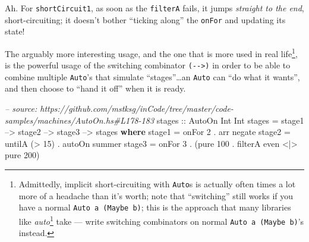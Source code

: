\documentclass[]{article}
\newenvironment{Shaded}{}{}
\newcommand{\KeywordTok}[1]{\textcolor[rgb]{0.00,0.44,0.13}{\textbf{{#1}}}}
\newcommand{\DataTypeTok}[1]{\textcolor[rgb]{0.56,0.13,0.00}{{#1}}}
\newcommand{\DecValTok}[1]{\textcolor[rgb]{0.25,0.63,0.44}{{#1}}}
\newcommand{\CommentTok}[1]{\textcolor[rgb]{0.38,0.63,0.69}{\textit{{#1}}}}
\newcommand{\OtherTok}[1]{\textcolor[rgb]{0.00,0.44,0.13}{{#1}}}
\newcommand{\FunctionTok}[1]{\textcolor[rgb]{0.02,0.16,0.49}{{#1}}}
\newcommand{\NormalTok}[1]{{#1}}
\renewcommand{\href}[2]{#2\footnote{\url{#1}}}
\begin{document}
Ah. For \texttt{shortCircuit1}, as soon as the \texttt{filterA} fails,
it jumps \emph{straight to the end}, short-circuiting; it doesn't bother
``ticking along'' the \texttt{onFor} and updating its state!

The arguably more interesting usage, and the one that is more used in
real life\footnote{Admittedly, implicit short-circuiting with
  \texttt{Auto}s is actually often times a lot more of a headache than
  it's worth; note that ``switching'' still works if you have a normal
  \texttt{Auto\ a\ (Maybe\ b)}; this is the approach that many libraries
  like \href{https://github.com/mstksg/auto.}{\emph{auto}} take ---
  write switching combinators on normal \texttt{Auto\ a\ (Maybe\ b)}'s
  instead.}, is the powerful usage of the switching combinator
\texttt{(-\/-\textgreater{})} in order to be able to combine multiple
\texttt{Auto}'s that simulate ``stages''\ldots{}an \texttt{Auto} can
``do what it wants'', and then choose to ``hand it off'' when it is
ready.

\begin{Shaded}
\begin{Highlighting}[]
\CommentTok{-- source: https://github.com/mstksg/inCode/tree/master/code-samples/machines/AutoOn.hs#L178-183}
\OtherTok{stages ::} \DataTypeTok{AutoOn} \DataTypeTok{Int} \DataTypeTok{Int}
\NormalTok{stages }\FunctionTok{=} \NormalTok{stage1 }\FunctionTok{-->} \NormalTok{stage2 }\FunctionTok{-->} \NormalTok{stage3 }\FunctionTok{-->} \NormalTok{stages}
  \KeywordTok{where}
    \NormalTok{stage1 }\FunctionTok{=} \NormalTok{onFor }\DecValTok{2} \FunctionTok{.} \NormalTok{arr negate}
    \NormalTok{stage2 }\FunctionTok{=} \NormalTok{untilA (}\FunctionTok{>} \DecValTok{15}\NormalTok{) }\FunctionTok{.} \NormalTok{autoOn summer}
    \NormalTok{stage3 }\FunctionTok{=} \NormalTok{onFor }\DecValTok{3} \FunctionTok{.} \NormalTok{(pure }\DecValTok{100} \FunctionTok{.} \NormalTok{filterA even }\FunctionTok{<|>} \NormalTok{pure }\DecValTok{200}\NormalTok{)}
\end{Highlighting}
\end{Shaded}
\end{document}
